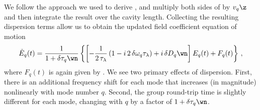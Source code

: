 We follow the approach we used to derive , and multiply both sides of  by $v_q\z$ and then integrate the result over the cavity length. Collecting the resulting dispersion terms allow us to obtain the updated field coefficient equation of motion
\begin{equation} \label{eqn:mml_1d_deq_dt_final}
    \dot{E}_q(t) = \frac{1}{1 + \delta \tau_q\wn} \left\{ \left[-\frac{1}{2\, \tau_\lambda} \left( 1 - i\, 2\, \delta \omega_q \tau_\lambda \right) + i\, \delta D_q\wn\right] E_q(t) + F_q(t) \right\}\, ,
\end{equation}
where $F_q(t)$ is again given by . We see two primary effects of dispersion. First, there is an additional frequency shift for each mode that increases (in magnitude) nonlinearly with mode number $q$. Second, the group round-trip time is slightly different for each mode, changing with $q$ by a factor of $1 + \delta \tau_q\wn$.
   

